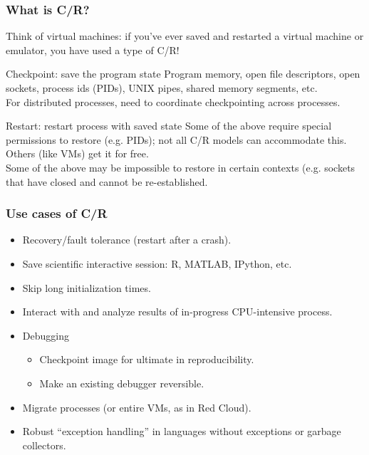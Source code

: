 \documentclass[compress]{beamer}
\begin{document}
\begin{frame}
\frametitle{What is C/R?}

Think of virtual machines: if you've ever saved and restarted a virtual machine
or emulator, you have used a type of C/R!

\begin{block}{Checkpoint: save the program state}
  Program memory, open file descriptors, open sockets, process ids (PIDs), UNIX pipes,
  shared memory segments, etc.\\
\vspace{1ex}
For distributed processes, need to coordinate checkpointing across processes.\\
\end{block}

\begin{block}{Restart: restart process with saved state}
  Some of the above require special permissions to restore (e.g. PIDs); not all
  C/R models can accommodate this. Others (like VMs) get it for free.\\
\vspace{1ex}
  Some of the above may be impossible to restore in certain contexts (e.g. sockets
  that have closed and cannot be re-established.\\
\end{block}


\end{frame}


\begin{frame}
\frametitle{Use cases of C/R}

\begin{itemize}
  \item{Recovery/fault tolerance (restart after a crash).}
  \item{Save scientific interactive session: R, MATLAB, IPython, etc.}
  \item{Skip long initialization times.}
  \item{Interact with and analyze results of in-progress CPU-intensive process.}
  \item{Debugging}
    \begin{itemize}
    \item{Checkpoint image for ultimate in reproducibility.}
    \item{Make an existing debugger reversible.}
    \end{itemize}
  \item{Migrate processes (or entire VMs, as in Red Cloud).}
  \item{Robust “exception handling” in languages without exceptions or garbage collectors.}
\end{itemize}

\end{frame}
\end{document}
